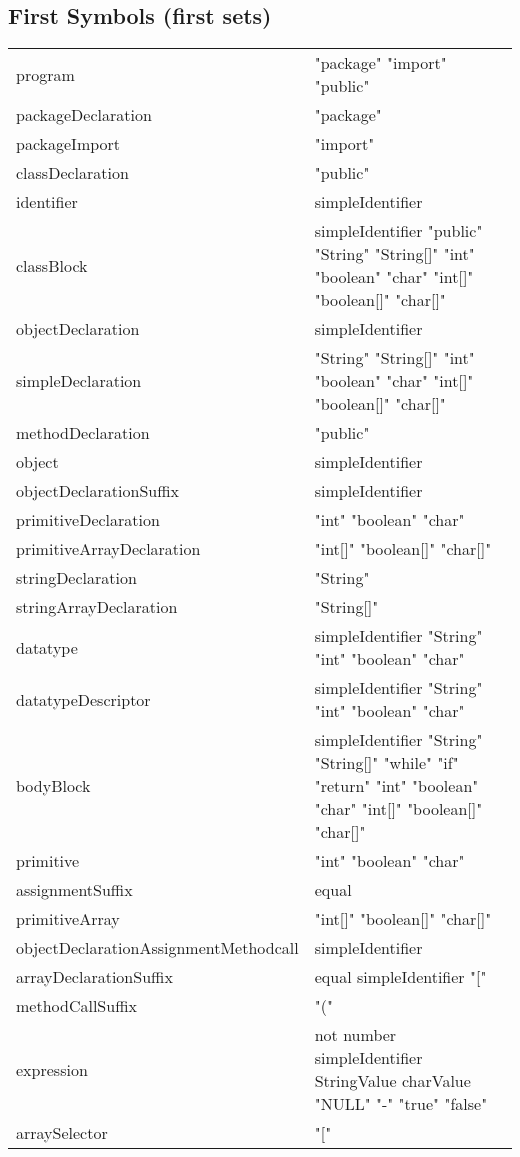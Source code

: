\subsection{First Symbols (first sets)}
\begin{tabular}{p{4cm}l}
program & "package" "import" "public" \\
packageDeclaration & "package" \\
packageImport & "import" \\
classDeclaration & "public" \\
identifier & simpleIdentifier \\
classBlock & simpleIdentifier "public" "String" "String[]" "int" "boolean" "char" "int[]" "boolean[]" "char[]" \\
objectDeclaration & simpleIdentifier \\
simpleDeclaration & "String" "String[]" "int" "boolean" "char" "int[]" "boolean[]" "char[]" \\
methodDeclaration & "public" \\
object & simpleIdentifier \\
objectDeclarationSuffix & simpleIdentifier \\
primitiveDeclaration & "int" "boolean" "char" \\
primitiveArrayDeclaration & "int[]" "boolean[]" "char[]" \\
stringDeclaration & "String" \\
stringArrayDeclaration & "String[]" \\
datatype & simpleIdentifier "String" "int" "boolean" "char" \\
datatypeDescriptor & simpleIdentifier "String" "int" "boolean" "char" \\
bodyBlock & simpleIdentifier "String" "String[]" "while" "if" "return" "int" "boolean" "char" "int[]" "boolean[]" "char[]" \\
primitive & "int" "boolean" "char" \\
assignmentSuffix & equal \\
primitiveArray & "int[]" "boolean[]" "char[]" \\
objectDeclarationAssignmentMethodcall & simpleIdentifier \\
arrayDeclarationSuffix & equal simpleIdentifier "[" \\
methodCallSuffix & "(" \\
expression & not number simpleIdentifier StringValue charValue "NULL" "-" "true" "false" \\
arraySelector & "[" \\

\end{tabular}

